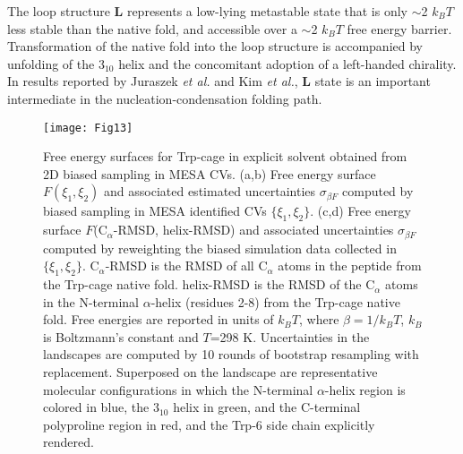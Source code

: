 \documentclass[12pt]{article}
\begin{document}
The loop structure \textbf{L} represents a low-lying metastable state that is only $\sim$2 $k_B T$ less stable than the native fold, and accessible over a $\sim$2 $k_B T$ free energy barrier. Transformation of the native fold into the loop structure is accompanied by unfolding of the $3_{10}$ helix and the concomitant adoption of a left-handed chirality. In results reported by Juraszek \textit{et al.} \cite{juraszek2006sampling} and Kim \textit{et al.}\cite{kim2015systematic}, \textbf{L} state is an important intermediate in the nucleation-condensation folding path. 

\begin{figure}[ht!]
\begin{center}
\texttt{[image: Fig13]} 
\caption{Free energy surfaces for Trp-cage in explicit solvent obtained from 2D biased sampling in MESA CVs. (a,b) Free energy surface $F(\xi_1,\xi_2)$ and associated estimated uncertainties $\sigma_{\beta F}$ computed by biased sampling in MESA identified CVs $\{\xi_1,\xi_2\}$. (c,d) Free energy surface $F$($\mathrm{C}_\alpha$-RMSD, helix-RMSD) and associated uncertainties $\sigma_{\beta F}$ computed by reweighting the biased simulation data collected in $\{\xi_1,\xi_2\}$. $\mathrm{C}_\alpha$-RMSD is the RMSD of all $\mathrm{C}_\alpha$ atoms in the peptide from the Trp-cage native fold. helix-RMSD is the RMSD of the $\mathrm{C}_\alpha$ atoms in the N-terminal $\alpha$-helix (residues 2-8) from the Trp-cage native fold. Free energies are reported in units of $k_B T$, where $\beta = 1/k_B T$, $k_B$ is Boltzmann's constant and $T$=298 K. Uncertainties in the landscapes are computed by 10 rounds of bootstrap resampling with replacement. Superposed on the landscape are representative molecular configurations in which the N-terminal $\alpha$-helix region is colored in blue, the $3_{10}$ helix in green, and the C-terminal polyproline region in red, and the Trp-6 side chain explicitly rendered.}
\label{FES_Trp_cage}
\end{center}
\end{figure}
\end{document}
